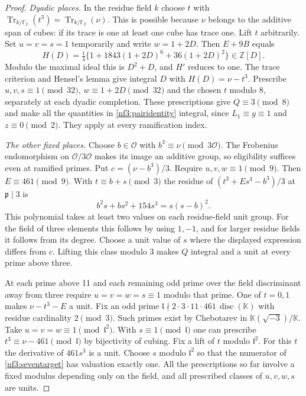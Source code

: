 \documentclass[11pt,letterpaper]{article}
\theoremstyle{definition}
\numberwithin{equation}{section}
\begin{document}
\begin{proof}
\smallskip\noindent
\emph{Dyadic places.}
In the residue field $k$ choose $t$ with
$\operatorname{Tr}_{k/\mathbb F_2}(t^3)=
\operatorname{Tr}_{k/\mathbb F_2}(\nu)$. This is possible because
$\nu$ belongs to the additive span of cubes: if its trace is one at
least one cube has trace one. Lift $t$ arbitrarily. Set $u=v=s=1$
temporarily and write $w=1+2D$. Then $E+9B$ equals
\[
 H(D)=\tfrac14\{1+1843(1+2D)^6+36(1+2D)^2\}\in\mathbb Z[D].
\]
Modulo the maximal ideal this is $D^2+D$, and $H'$ reduces to one.
The trace criterion and Hensel's lemma give integral $D$ with
$H(D)=\nu-t^3$. Prescribe $u,v,s\equiv1\pmod{32}$,
$w\equiv1+2D\pmod{32}$ and the chosen $t$ modulo 8, separately
at each dyadic completion. These prescriptions give
$Q\equiv3\pmod8$ and make all the quantities in
\eqref{nf3:pairidentity} integral, since $L_1\equiv y\equiv1$
and $z\equiv0\pmod2$. They apply at every ramification index.

\smallskip\noindent
\emph{The other fixed places.}
Choose $b\in\mathcal O$ with $b^3\equiv\nu\pmod{3\mathcal O}$.
The Frobenius endomorphism on $\mathcal O/3\mathcal O$ makes its
image an additive group, so eligibility suffices even at ramified
primes. Put $c=(\nu-b^3)/3$. Require $u,v,w\equiv1\pmod9$.
Then $E\equiv461\pmod9$. With $t\equiv b+s\pmod3$ the residue of
$(t^3+Es^3-b^3)/3$ at $\mathfrak p\mid3$ is
\[
 b^2s+bs^2+154s^3=s(s-b)^2.
\]
This polynomial takes at least two values on each residue-field unit
group. For the field of three elements this follows by using $1,-1$,
and for larger residue fields it follows from its degree. Choose a
unit value of $s$ where the displayed expression differs from $c$.
Lifting this class modulo 3 makes $Q$ integral and a unit at every
prime above three.

At each prime above 11 and each remaining odd prime over the field
discriminant away from three require $u=v=w=s\equiv1$ modulo that prime.
One of $t=0,1$ makes $\nu-t^3-E$ a unit. Fix an odd prime
$\mathfrak l\nmid 2\cdot3\cdot11\cdot461\,\operatorname{disc}(\mathbb K)$ with residue cardinality
$2\pmod3$. Such primes exist by Chebotarev in
$\mathbb K(\sqrt{-3})/\mathbb K$. Take $u=v=w\equiv1\pmod{\mathfrak
l^2}$. With $s\equiv1\pmod{\mathfrak l}$ one can prescribe
$t^3\equiv\nu-461\pmod{\mathfrak l}$ by bijectivity of cubing.
Fix a lift of $t$ modulo $\mathfrak l^2$. For this $t$ the derivative of $461s^3$ is a unit. Choose $s$ modulo
$\mathfrak l^2$ so that the numerator of \eqref{nf3:seventarget}
has valuation exactly one. All the prescriptions so far involve a
fixed modulus depending only on the field, and all prescribed
classes of $u,v,w,s$ are units.


\end{proof}
\end{document}
